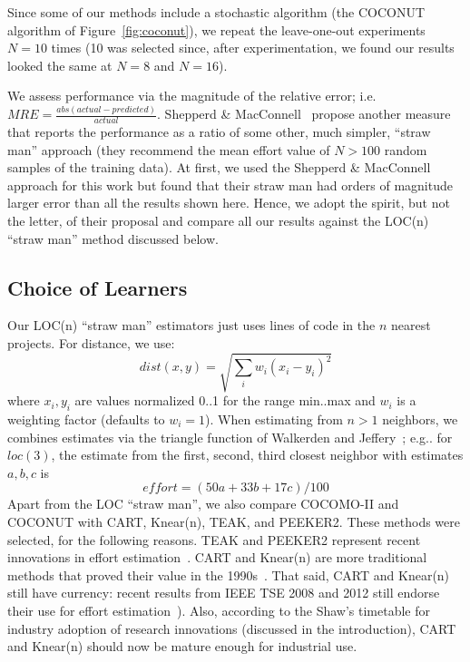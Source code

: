 \documentclass{sig-alternate}
\newcommand{\fig}[1]{Figure~\ref{fig:#1}}
\begin{document}
Since some of our methods include a stochastic
algorithm (the COCONUT algorithm of \fig{coconut}),
we repeat the leave-one-out experiments $N=10$ times
(10 was selected since, after experimentation, we
found our results looked the same at $N=8$ and
$N=16$).

We assess  
performance via the magnitude of the relative error; i.e. 
\mbox{$ \mathit{MRE}=\frac{abs(\mathit{actual} - \mathit{predicted})}{\mathit{actual}}$}. 
Shepperd \& MacConnell~\cite{shepperd12a} propose
another measure that reports the performance as a
ratio of some other, much
simpler, ``straw man'' approach (they recommend the
mean effort value of $N>100$ random samples of the
training data). At first, we used the Shepperd \&
MacConnell approach for this work but found that
their straw man had orders of magnitude larger error
than all the results shown here. Hence, we adopt the
spirit, but not the letter, of their proposal and
compare all our results against the LOC(n) ``straw
man'' method discussed below.
 

\subsection{Choice of Learners}\label{sect:whatlearn}

Our LOC(n) ``straw man'' 
estimators just uses  lines of code
in the $n$ nearest projects. For distance,
we use:
\begin{equation}\label{eq:dist}
\mathit{dist}(x,y) = \sqrt{\sum_i w_i (x_i-y_i)^2}
\end{equation} 
where $x_i,y_i$ 
are values normalized 0..1 for the range min..max
and $w_i$ is a weighting factor (defaults to $w_i=1$).
When  estimating from $n>1$ neighbors,
we combines estimates via the triangle 
function of  Walkerden
and Jeffery~\cite{Walkerden1999}; 
e.g.. for $loc(3)$, the  estimate
from the first, second, third closest neighbor with estimates
$a,b,c$ is 
\begin{equation}\label{eq:tri}
\mathit{effort} = (50a + 33b + 17c)/100
\end{equation}
Apart from the LOC ``straw man'',
we also compare COCOMO-II and COCONUT with CART,
Knear(n), TEAK, and PEEKER2. 
These  methods were  selected, for the following reasons.
TEAK  and PEEKER2   represent   recent innovations in effort
estimation~\cite{koc11b,papa13}.  
CART and Knear(n) are more traditional methods  that proved their value  in the 1990s~\cite{shepperd97,Walkerden1999}. That said, CART and Knear(n)
still have currency: 
recent results from IEEE TSE 2008 and 2012 still endorse their  use for effort estimation~\cite{dejaeger12,koc11a,keung2008b}).
Also, according to the Shaw's timetable for industry adoption of research innovations
(discussed in the introduction),  CART and Knear(n) should now be mature enough for industrial use.
\end{document}
